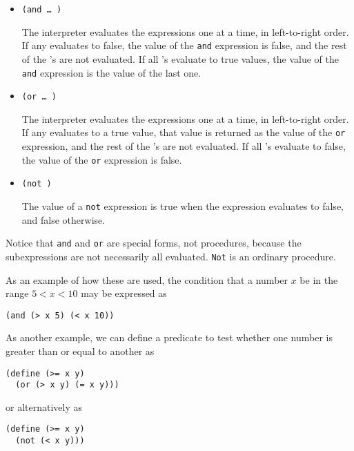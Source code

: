 \begin{itemize}
\item \texttt{(and  \ldots{} )}

The interpreter evaluates the expressions  one at a time, in
left-to-right order.  If any  evaluates to false, the value of
the \texttt{and} expression is false, and the rest of the 's
are not evaluated.  If all 's evaluate to true values, the
value of the \texttt{and} expression is the value of the last one.

\item \texttt{(or  \ldots{} )}

The interpreter evaluates the expressions  one at a time, in
left-to-right order.  If any  evaluates to a true value, that
value is returned as the value of the \texttt{or} expression, and the
rest of the 's are not evaluated.  If all 's evaluate
to false, the value of the \texttt{or} expression is false.

\item \texttt{(not )}

The value of a \texttt{not} expression is true
when the expression  evaluates to false, and false otherwise.
\end{itemize}

\item Notice that \texttt{and} and \texttt{or} are special forms, not
  procedures, because the subexpressions are not necessarily all
  evaluated.  \texttt{Not} is an ordinary procedure.

As an example of how these are used, the condition that a number
$x$ be in the range $5 < x < 10$ may be expressed as

\begin{verbatim}
(and (> x 5) (< x 10))
\end{verbatim}

As another example, we can define a predicate to test whether one
number is greater than or equal to another as

\begin{verbatim}
(define (>= x y)
  (or (> x y) (= x y)))
\end{verbatim}

\noindent or alternatively as

\begin{verbatim}
(define (>= x y)
  (not (< x y)))
\end{verbatim}

